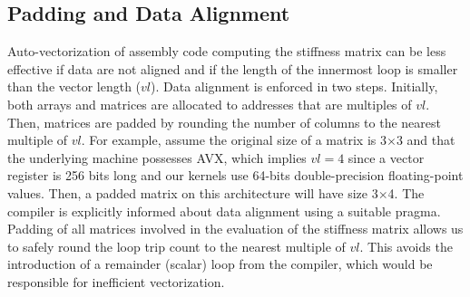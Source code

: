 \documentclass[conference]{IEEEtran}
\begin{document}
\subsection{Padding and Data Alignment}
Auto-vectorization of assembly code computing the stiffness matrix can be less effective if data are not aligned and if the length of the innermost loop is smaller than the vector length ($vl$). Data alignment is enforced in two steps. Initially, both arrays and matrices are allocated to addresses that are multiples of $vl$. Then, matrices are padded by rounding the number of columns to the nearest multiple of $vl$. For example, assume the original size of a matrix is 3$\times$3 and that the underlying machine possesses AVX, which implies $vl=4$ since a vector register is 256 bits long and our kernels use 64-bits double-precision floating-point values. Then, a padded matrix on this architecture will have size 3$\times$4. The compiler is explicitly informed about data alignment using a suitable pragma. Padding of all matrices involved in the evaluation of the stiffness matrix allows us to safely round the loop trip count to the nearest multiple of $vl$. This avoids the introduction of a remainder (scalar) loop from the compiler, which would be responsible for inefficient vectorization. 

\end{document}
